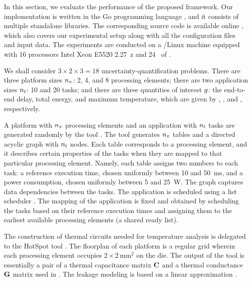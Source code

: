 In this section, we evaluate the performance of the proposed framework. Our
implementation is written in the Go programming language \cite{go}, and it
consists of multiple standalone libraries. The corresponding source code is
available online \cite{sources}, which also covers our experimental setup along
with all the configuration files and input data. The experiments are conducted
on a /Linux machine equipped with 16 processors Intel Xeon E5520
2.27~z and 24~ of .

We shall consider $3 \times 2 \times 3 = 18$ uncertainty-quantification
problems. There are three platform sizes ${n_\pi}$: 2, 4, and 8 processing elements;
there are two application sizes ${n_t}$: 10 and 20 tasks; and there are three
quantities of interest $g$: the end-to-end delay, total energy, and maximum
temperature, which are given by , ,
and , respectively.

A platform with ${n_\pi}$ processing elements and an application with ${n_t}$ tasks
are generated randomly by the  tool \cite{dick1998}. The tool generates
${n_\pi}$ tables and a directed acyclic graph with ${n_t}$ nodes. Each table
corresponds to a processing element, and it describes certain properties of the
tasks when they are mapped to that particular processing element. Namely, each
table assigns two numbers to each task: a reference execution time, chosen
uniformly between 10 and 50~ms, and a power consumption, chosen uniformly
between 5 and 25~W. The graph captures data dependencies between the tasks. The
application is scheduled using a list scheduler \cite{adam1974}. The mapping of
the application is fixed and obtained by scheduling the tasks based on their
reference execution times and assigning them to the earliest available
processing elements (a shared ready list).

The construction of thermal  circuits needed for temperature analysis is
delegated to the HotSpot tool \cite{skadron2004}. The floorplan of each platform
is a regular grid wherein each processing element occupies $2 \times
2~\text{mm}^2$ on the die. The output of the tool is essentially a pair of a
thermal capacitance matrix $\mathbf{C}$ and a thermal conductance $\mathbf{G}$ matrix used in
. The leakage modeling is based on a linear approximation
\cite{yang2013, ukhov2012, liu2007}.

